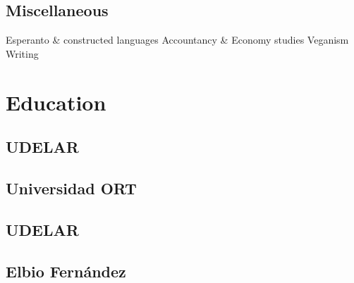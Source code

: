 \documentclass[]{deedy-resume-openfont}
\begin{document}
\begin{minipage}[t]{0.33\textwidth}
\sectionsep

\subsection{Miscellaneous}
Esperanto \& constructed languages \textbullet{} Accountancy \& Economy studies \textbullet{} Veganism \textbullet{} Writing

\sectionsep


\section{Education} 

\subsection{UDELAR}
\sectionsep

\subsection{Universidad ORT}
\sectionsep

\subsection{UDELAR}
\sectionsep

\subsection{Elbio Fernández}
\sectionsep

%
%

\end{minipage} 
\hfill
\end{document}
